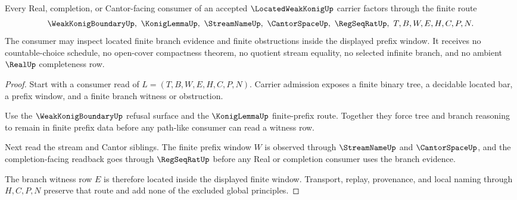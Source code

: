 \begin{theorem}
\label{thm:located-weak-konig-finite-branch-route}
Every Real, completion, or Cantor-facing consumer of an accepted $\LocatedWeakKonigUp$ carrier factors through the finite route
$$
\WeakKonigBoundaryUp,\ \KonigLemmaUp,\ \StreamNameUp,\ \CantorSpaceUp,\ \RegSeqRatUp,\ T,B,W,E,H,C,P,N .
$$
The consumer may inspect located finite branch evidence and finite obstructions inside the displayed prefix window. It receives no countable-choice schedule, no open-cover compactness theorem, no quotient stream equality, no selected infinite branch, and no ambient $\RealUp$ completeness row.
\end{theorem}
\begin{proof}
Start with a consumer read of $L=(T,B,W,E,H,C,P,N)$. Carrier admission exposes a finite binary tree, a decidable located bar, a prefix window, and a finite branch witness or obstruction.

Use the $\WeakKonigBoundaryUp$ refusal surface and the $\KonigLemmaUp$ finite-prefix route. Together they force tree and branch reasoning to remain in finite prefix data before any path-like consumer can read a witness row.

Next read the stream and Cantor siblings. The finite prefix window $W$ is observed through $\StreamNameUp$ and $\CantorSpaceUp$, and the completion-facing readback goes through $\RegSeqRatUp$ before any Real or completion consumer uses the branch evidence.

The branch witness row $E$ is therefore located inside the displayed finite window. Transport, replay, provenance, and local naming through $H,C,P,N$ preserve that route and add none of the excluded global principles.
\end{proof}



